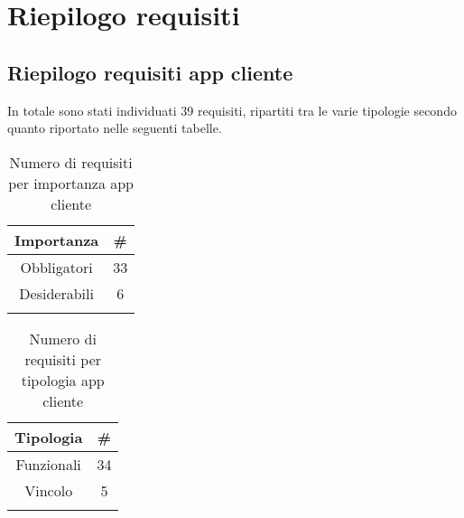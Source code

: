 \section{Riepilogo requisiti}
\subsection{Riepilogo requisiti app cliente}
In totale sono stati individuati 39 requisiti, ripartiti tra le varie tipologie secondo quanto riportato nelle seguenti tabelle.\\
\begin{center}
\begin{minipage}[c]{0.7\linewidth}
    \begin{small}
    \begin{longtable}{|c|c|}
    \hline
         \textbf{Importanza}& \# \\\hline
         Obbligatori & 33\\\hline
         Desiderabili & 6\\
         \hline
    \caption{Numero di requisiti per importanza app cliente}
    \label{tab:requisiti-importanza-cliente}
    \end{longtable}   
    \end{small}
\end{minipage}


\begin{minipage}[c]{0.7\linewidth}
    \begin{small}
    \begin{longtable}{|c|c|}
    \hline
         \textbf{Tipologia}& \# \\\hline
         Funzionali & 34\\\hline
         Vincolo & 5\\
         \hline
    \caption{Numero di requisiti per tipologia app cliente}
    \label{tab:requisiti-tipolgia-cliente}
    \end{longtable}   
    \end{small}
\end{minipage}
\end{center}
